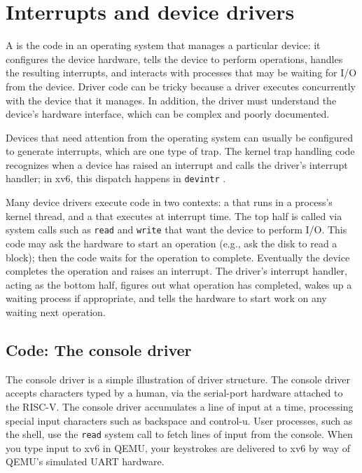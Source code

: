\chapter{Interrupts and device drivers}
\label{CH:INTERRUPT}

A
is the code in an operating system that manages a particular device:
it configures the device hardware,
tells the device to perform operations,
handles the resulting interrupts,
and interacts with processes that may be waiting
for I/O from the device.
Driver code can be tricky
because a driver executes concurrently with the device that it manages.  In
addition, the driver must understand the device's hardware interface,
which can be complex and poorly documented.

Devices that need attention from the operating system can usually be
configured to generate interrupts, which are one type of trap.
The kernel trap handling code recognizes when a device
has raised an interrupt and calls the driver's interrupt handler;
in xv6, this dispatch happens in {\tt devintr} .

Many device drivers execute code in two contexts: a  that runs in a process's kernel thread, and a  that executes at interrupt time. The top half
is called via system calls such as {\tt read} and {\tt write} that want
the device to perform I/O. This code may ask the hardware to start an
operation (e.g., ask the disk to read a block); then the code waits for
the operation to complete. Eventually the device completes the
operation and raises an interrupt. The driver's interrupt handler,
acting as the bottom half,
figures out what operation has completed, wakes up a waiting
process if appropriate, and tells the hardware to start work
on any waiting next operation.

\section{Code: The console driver}

The console driver 
is a simple illustration of driver structure. The
console driver accepts characters typed by a human, via the 
serial-port hardware attached to the RISC-V. The console driver accumulates a
line of input at a time, processing special input characters such as
backspace and control-u. User processes, such as the shell, use
the {\tt read} system call to fetch lines of input from the console.
When you type input to xv6 in QEMU, your keystrokes are delivered to
xv6 by way of QEMU's simulated UART hardware.

